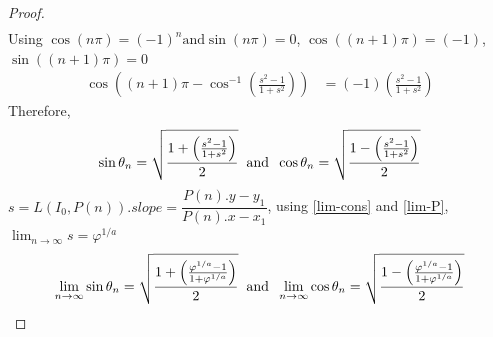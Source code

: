 \documentclass[preprint,12pt]{elsarticle}
\begin{document}
\begin{proof}
\begin{multline*}
	\end{multline*}
	Using $\cos(n\pi) = (-1)^n\text{and}\sin(n\pi) = 0$, $\cos((n+1)\pi) = (-1)$, $\sin((n+1)\pi) = 0$
	\begin{align*}
		\cos\left((n+1)\pi - \cos^{-1}\left(\frac{s^2-1}{1+s^2}\right)\right) & = (-1)\left(\frac{s^2-1}{1+s^2}\right) 
	\end{align*}
	Therefore, $$\sin\theta_n = \sqrt{\dfrac{1 + \left(\frac{s^2-1}{1+s^2}\right)}{2}}\hspace{2mm}\text{and}\hspace{2mm}\cos\theta_n = \sqrt{\dfrac{1 - \left(\frac{s^2-1}{1+s^2}\right)}{2}}$$
	$s = L(I_0, P(n)).slope = \dfrac{P(n).y - y_1}{P(n).x - x_1}$, using \ref{lim-cons} and \ref{lim-P}, $\lim_{n \to \infty} s = \varphi^{1/a}$
	$$\lim_{n \to \infty}\sin\theta_n = \sqrt{\dfrac{1 + \left(\frac{\varphi^{1/a}-1}{1+\varphi^{1/a}}\right)}{2}}\hspace{2mm}\text{and}\hspace{2mm}\lim_{n \to \infty}\cos\theta_n = \sqrt{\dfrac{1 - \left(\frac{\varphi^{1/a}-1}{1+\varphi^{1/a}}\right)}{2}}$$
		

\end{proof}
\end{document}
